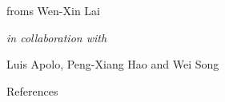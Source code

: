 \documentclass[
	10pt
	,noamsthm
]{beamer}
\begin{document}
\begin{frame}

\centering

\huge
{}
\bigskip

\large
froms Wen-Xin Lai\ 

\textit{\normalsize in collaboration with}

	Luis Apolo,
	Peng-Xiang Hao 
	and Wei Song \\[2ex]

\end{frame}




\begin{frame}[allowframebreaks]{References}
\renewcommand*{\bibfont}{\footnotesize}
\printbibliography %
\end{frame}
\end{document}
